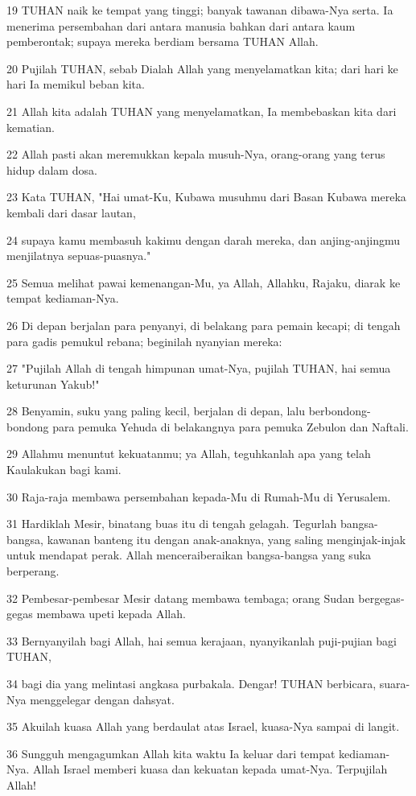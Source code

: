 \par 19 TUHAN naik ke tempat yang tinggi; banyak tawanan dibawa-Nya serta. Ia menerima persembahan dari antara manusia bahkan dari antara kaum pemberontak; supaya mereka berdiam bersama TUHAN Allah.
\par 20 Pujilah TUHAN, sebab Dialah Allah yang menyelamatkan kita; dari hari ke hari Ia memikul beban kita.
\par 21 Allah kita adalah TUHAN yang menyelamatkan, Ia membebaskan kita dari kematian.
\par 22 Allah pasti akan meremukkan kepala musuh-Nya, orang-orang yang terus hidup dalam dosa.
\par 23 Kata TUHAN, "Hai umat-Ku, Kubawa musuhmu dari Basan Kubawa mereka kembali dari dasar lautan,
\par 24 supaya kamu membasuh kakimu dengan darah mereka, dan anjing-anjingmu menjilatnya sepuas-puasnya."
\par 25 Semua melihat pawai kemenangan-Mu, ya Allah, Allahku, Rajaku, diarak ke tempat kediaman-Nya.
\par 26 Di depan berjalan para penyanyi, di belakang para pemain kecapi; di tengah para gadis pemukul rebana; beginilah nyanyian mereka:
\par 27 "Pujilah Allah di tengah himpunan umat-Nya, pujilah TUHAN, hai semua keturunan Yakub!"
\par 28 Benyamin, suku yang paling kecil, berjalan di depan, lalu berbondong-bondong para pemuka Yehuda di belakangnya para pemuka Zebulon dan Naftali.
\par 29 Allahmu menuntut kekuatanmu; ya Allah, teguhkanlah apa yang telah Kaulakukan bagi kami.
\par 30 Raja-raja membawa persembahan kepada-Mu di Rumah-Mu di Yerusalem.
\par 31 Hardiklah Mesir, binatang buas itu di tengah gelagah. Tegurlah bangsa-bangsa, kawanan banteng itu dengan anak-anaknya, yang saling menginjak-injak untuk mendapat perak. Allah menceraiberaikan bangsa-bangsa yang suka berperang.
\par 32 Pembesar-pembesar Mesir datang membawa tembaga; orang Sudan bergegas-gegas membawa upeti kepada Allah.
\par 33 Bernyanyilah bagi Allah, hai semua kerajaan, nyanyikanlah puji-pujian bagi TUHAN,
\par 34 bagi dia yang melintasi angkasa purbakala. Dengar! TUHAN berbicara, suara-Nya menggelegar dengan dahsyat.
\par 35 Akuilah kuasa Allah yang berdaulat atas Israel, kuasa-Nya sampai di langit.
\par 36 Sungguh mengagumkan Allah kita waktu Ia keluar dari tempat kediaman-Nya. Allah Israel memberi kuasa dan kekuatan kepada umat-Nya. Terpujilah Allah!

